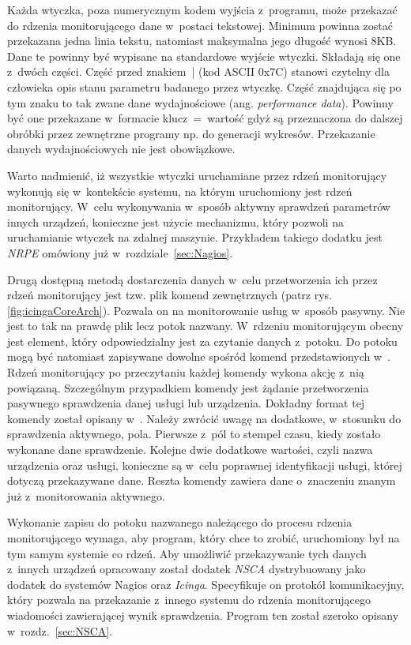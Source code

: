 Każda wtyczka, poza numerycznym kodem wyjścia z~programu, może
przekazać do rdzenia monitorującego dane w~postaci tekstowej. Minimum
powinna zostać przekazana jedna linia tekstu, natomiast maksymalna
jego długość wynosi 8KB. Dane te powinny być wypisane na standardowe
wyjście wtyczki. Składają się one z~dwóch części. Część przed
znakiem~| (kod ASCII 0x7C) stanowi czytelny dla człowieka opis stanu parametru badanego
przez wtyczkę. Część znajdująca się po tym znaku to tak zwane dane
wydajnościowe (ang. {\em performance data}). Powinny być one
przekazane w~formacie klucz~=~wartość gdyż są przeznaczona do dalszej
obróbki przez zewnętrzne programy np. do generacji
wykresów. Przekazanie danych wydajnościowych nie jest obowiązkowe.

Warto nadmienić, iż wszystkie wtyczki uruchamiane przez rdzeń
monitorujący wykonują się w~kontekście systemu, na którym uruchomiony
jest rdzeń monitorujący. W~celu wykonywania w~sposób aktywny sprawdzeń
parametrów innych urządzeń, konieczne jest użycie mechanizmu, który
pozwoli na uruchamianie wtyczek na zdalnej maszynie. Przykładem
takiego dodatku jest {\em NRPE} omówiony już w~rozdziale~\ref{sec:Nagios}.

Drugą dostępną metodą dostarczenia danych w~celu przetworzenia ich
przez rdzeń monitorujący jest tzw. plik komend zewnętrznych (patrz
rys.\ref{fig:icingaCoreArch}). Pozwala on na monitorowanie usług
w~sposób pasywny. Nie jest to tak na prawdę plik lecz potok
nazwany. W~rdzeniu monitorującym obecny jest element, który
odpowiedzialny jest za czytanie danych z~potoku. Do potoku mogą być
natomiast zapisywane dowolne spośród komend przedstawionych
w~\cite[412-436]{www:IcingaDoc}. Rdzeń monitorujący po przeczytaniu
każdej komendy wykona akcję z~nią powiązaną. Szczególnym przypadkiem
komendy jest żądanie przetworzenia pasywnego sprawdzenia danej usługi
lub urządzenia. Dokładny format tej komendy został opisany
w~\cite[296-299]{www:IcingaDoc}. Należy zwrócić uwagę na dodatkowe,
w~stosunku do sprawdzenia aktywnego, pola. Pierwsze z~pól to stempel
czasu, kiedy zostało wykonane dane sprawdzenie. Kolejne dwie dodatkowe
wartości, czyli nazwa urządzenia oraz usługi, konieczne są w~celu
poprawnej identyfikacji usługi, której dotyczą przekazywane
dane. Reszta komendy zawiera dane o~znaczeniu znanym już
z~monitorowania aktywnego.

Wykonanie zapisu do potoku nazwanego należącego do procesu rdzenia
monitorującego wymaga, aby program, który chce to zrobić, uruchomiony
był na tym samym systemie co rdzeń. Aby umożliwić przekazywanie tych
danych z~innych urządzeń opracowany został dodatek {\em NSCA} dystrybuowany
jako dodatek do systemów Nagios oraz {\em Icinga}. Specyfikuje on protokół
komunikacyjny, który pozwala na przekazanie z~innego systemu do
rdzenia monitorującego wiadomości zawierającej wynik
sprawdzenia. Program ten został szeroko opisany
w~rozdz.~\ref{sec:NSCA}.

